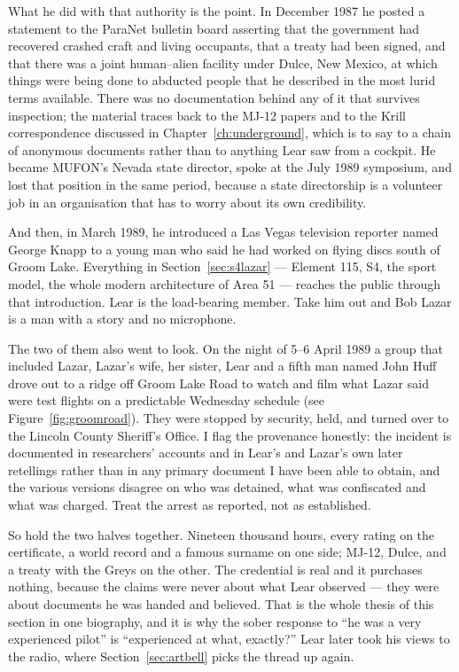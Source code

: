 What he did with that authority is the point. In December 1987 he posted a statement to the
ParaNet bulletin board asserting that the government had recovered crashed craft and living
occupants, that a treaty had been signed, and that there was a joint human--alien facility under
Dulce, New Mexico, at which things were being done to abducted people that he described in the
most lurid terms available. There was no documentation behind any of it that survives inspection;
the material traces back to the MJ-12 papers and to the Krill correspondence discussed in
Chapter~\ref{ch:underground}, which is to say to a chain of anonymous documents rather than to anything
Lear saw from a cockpit. He became MUFON's Nevada state director, spoke at the July 1989
symposium, and lost that position in the same period, because a state directorship is a
volunteer job in an organisation that has to worry about its own credibility.

And then, in March 1989, he introduced a Las Vegas television reporter named George Knapp to a
young man who said he had worked on flying discs south of Groom Lake. Everything in
Section~\ref{sec:s4lazar} --- Element 115, S4, the sport model, the whole modern architecture of
Area 51 --- reaches the public through that introduction. Lear is the load-bearing member. Take
him out and Bob Lazar is a man with a story and no microphone.

The two of them also went to look. On the night of 5--6 April 1989 a group that included Lazar,
Lazar's wife, her sister, Lear and a fifth man named John Huff drove out to a ridge off Groom Lake
Road to watch and film what Lazar said were test flights on a predictable Wednesday schedule (see
Figure~\ref{fig:groomroad}). They were stopped by security, held, and turned over to the Lincoln
County Sheriff's Office. I flag the provenance honestly: the incident is documented in
researchers' accounts and in Lear's and Lazar's own later retellings rather than in any primary
document I have been able to obtain, and the various versions disagree on who was detained, what
was confiscated and what was charged. Treat the arrest as reported, not as established.

So hold the two halves together. Nineteen thousand hours, every rating on the certificate, a
world record and a famous surname on one side; MJ-12, Dulce, and a treaty with the Greys on the
other. The credential is real and it purchases nothing, because the claims were never about what
Lear observed --- they were about documents he was handed and believed. That is the whole thesis
of this section in one biography, and it is why the sober response to ``he was a very experienced
pilot'' is ``experienced at what, exactly?'' Lear later took his views to the radio, where
Section~\ref{sec:artbell} picks the thread up again.

